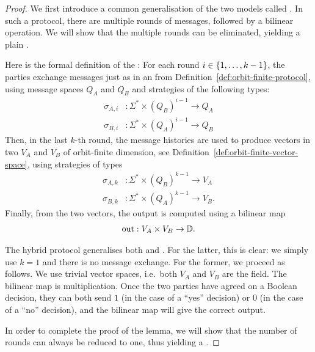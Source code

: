 \begin{proof}
  \AP
    We first introduce a common generalisation of the two models called . 
    In such a protocol, there are multiple rounds of messages, 
    followed by a bilinear operation. We will show that the multiple rounds can be eliminated,
    yielding a plain .
    
    Here is the formal definition of the :
    For each round $i \in \{1, \ldots, k-1\}$, the parties exchange messages just as in an 
     from Definition~\ref{def:orbit-finite-protocol}, 
    using message spaces $Q_A$ and $Q_B$ and strategies of the following types: 
        \begin{align*}
        \sigma_{A,i} & : \Sigma^* \times (Q_B)^{i-1} \to Q_A\\
        \sigma_{B,i} & : \Sigma^* \times (Q_A)^{i-1} \to Q_B
        \end{align*}
    Then, in  the last $k$-th round, the message histories are used to produce vectors 
    in two  $V_A$ and $V_B$ of orbit-finite dimension, 
    see Definition~\ref{def:orbit-finite-vector-space}, using strategies 
    of types
    \begin{align*}
        \sigma_{A,k} & : \Sigma^* \times (Q_B)^{k-1} \to V_A\\
        \sigma_{B,k} & : \Sigma^* \times (Q_A)^{k-1} \to V_B.
        \end{align*}
    Finally, from the two vectors, the output is computed using a bilinear map
    \begin{align*}
        \text{out} : V_A \times V_B \to \mathbb D.
    \end{align*}
    

    The hybrid protocol generalises both  and 
    . 
    For the latter, this is clear: we simply use $k=1$ and there is no message exchange. 
    For the former, we proceed as follows.
    We use  trivial vector spaces, i.e.~both $V_A$ and $V_B$ are the field. 
    The bilinear map is multiplication. 
    Once the two parties have agreed on a Boolean decision, 
    they can both send $1$ (in the case of a ``yes'' decision) or $0$ (in the case of a ``no'' decision), 
    and the bilinear map will give the correct output. 
    
    In order to complete the proof of the lemma, we will show that the number
    of rounds can always be reduced to one, thus yielding a .


\end{proof}
